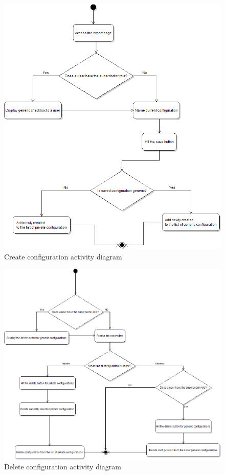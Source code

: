 \documentclass[thesis=B,english]{FITthesis}[2012/10/20]
\begin{document}
\begin{figure}
	\centering
 	\includegraphics[width=1\textwidth]{images/createConfigurationDiagram.png}
 	\caption{Create configuration activity diagram}
 	\label{fig:createConfigurationDiagram}
\end{figure}

\begin{figure}
	\centering
 	\includegraphics[width=1\textwidth]{images/deleteConfigurationDiagram.png}
 	\caption{Delete configuration activity diagram}
 	\label{fig:deleteConfigurationDiagram}
\end{figure}
\end{document}
